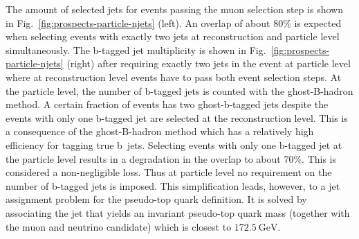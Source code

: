 The amount of selected jets for events passing the muon selection step is shown in Fig.~\ref{fig:prospects-particle-njets} (left). 
An overlap of about 80\% is expected when selecting events with exactly two jets at reconstruction and particle level simultaneously. 
The b-tagged jet multiplicity is shown in Fig.~\ref{fig:prospects-particle-njets} (right) after requiring exactly two jets in the event at particle level 
where at reconstruction level events have to pass both event selection steps. 
At the particle level, the number of b-tagged jets is counted with the ghost-B-hadron method. 
A certain fraction of events has two ghost-b-tagged jets despite the events with only one b-tagged jet are selected at the reconstruction level. 
This is a consequence of the ghost-B-hadron method which has a relatively high efficiency for tagging true b~jets. 
Selecting events with only one b-tagged jet at the particle level results in a degradation in the overlap to about 70\%. 
This is considered a non-negligible loss. 
Thus at particle level no requirement on the number of b-tagged jets is imposed. 
This simplification leads, however, to a jet assignment problem for the pseudo-top quark definition. 
It is solved by associating the jet that yields an invariant pseudo-top quark mass (together with the muon and neutrino candidate) which is closest to $172.5~\mathrm{GeV}$.



